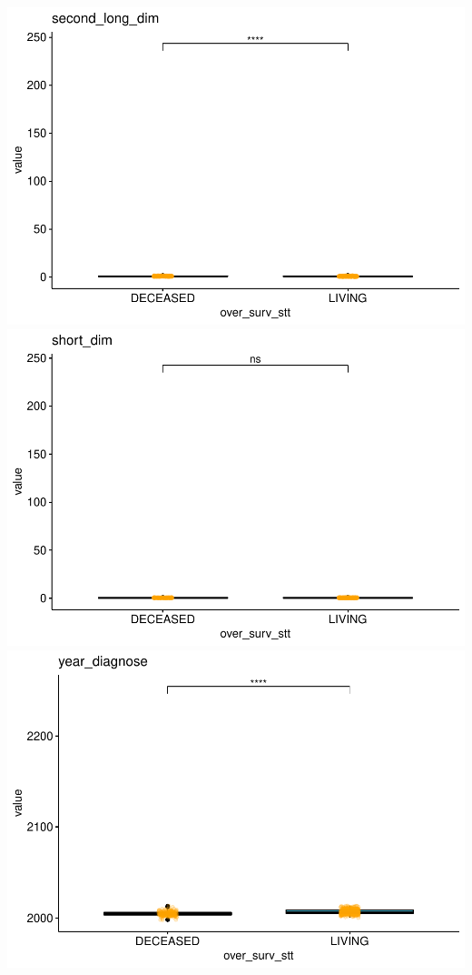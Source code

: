 \documentclass[]{article}
\begin{document}
\includegraphics{figs/render-unnamed-chunk-11-7.pdf}
\includegraphics{figs/render-unnamed-chunk-11-8.pdf}
\includegraphics{figs/render-unnamed-chunk-11-9.pdf}
\end{document}
